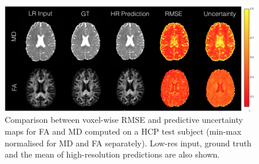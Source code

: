 \begin{figure}[t]
	
	\centering
	\includegraphics[width=\linewidth]{chapter_3/figures/fig_4_2.png}
	\small
	\caption{Comparison between voxel-wise RMSE and predictive uncertainty maps for FA and MD computed on a HCP test subject (min-max normalised for MD and FA separately). Low-res input, ground truth and the mean of high-resolution predictions are also shown.} 
	\label{fig:uncertainty_map}
\end{figure}

